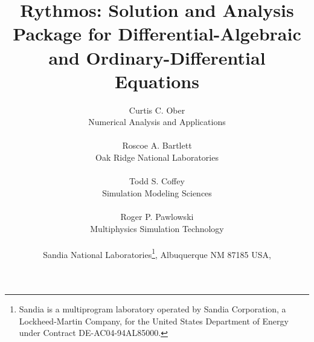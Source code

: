 \documentclass[pdf,11pt]{SANDreport}
\title{ Rythmos: Solution and Analysis Package for Differential-Algebraic and Ordinary-Differential Equations }
\author{
Curtis C. Ober \\ Numerical Analysis and Applications \\ \\
Roscoe A. Bartlett \\ Oak Ridge National Laboratories \\ \\
Todd S. Coffey \\ Simulation Modeling Sciences \\ \\
Roger P. Pawlowski \\ Multiphysics Simulation Technology \\ \\
Sandia National Laboratories\footnote{
Sandia is a multiprogram laboratory operated by Sandia Corporation, a
Lockheed-Martin Company, for the United States Department of Energy
under Contract DE-AC04-94AL85000.}, Albuquerque NM 87185 USA, \\
}
\date{}
\begin{document}
\maketitle

%
\begin{abstract}
  
\end{abstract}

%
\clearpage



%
\clearpage
\tableofcontents


% 


%     


\end{document}
